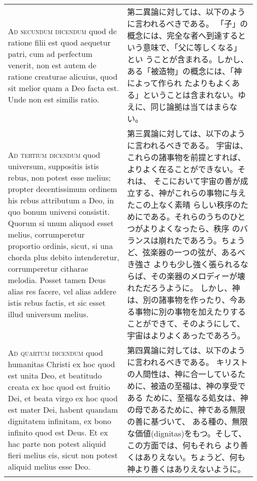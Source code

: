 \documentclass[10pt]{jsarticle} %
\begin{document}
\begin{longtable}{p{21em}p{21em}}
\\


{\scshape Ad secundum dicendum} quod de ratione filii
est quod aequetur patri, cum ad perfectum venerit, non est autem de
ratione creaturae alicuius, quod sit melior quam a Deo facta est. Unde
non est similis ratio.


&

第二異論に対しては、以下のように言われるべきである。
「子」の概念には、完全な者へ到達するという意味で、「父に等しくなる」とい
 うことが含まれる。しかし、ある「被造物」の概念には、「神によって作られ
 たよりもよくある」ということは含まれない。ゆえに、同じ論拠は当てはまらない。


\\


{\scshape Ad tertium dicendum} quod universum,
suppositis istis rebus, non potest esse melius; propter decentissimum
ordinem his rebus attributum a Deo, in quo bonum universi
consistit. Quorum si unum aliquod esset melius, corrumperetur proportio
ordinis, sicut, si una chorda plus debito intenderetur, corrumperetur
citharae melodia. Posset tamen Deus alias res facere, vel alias addere
istis rebus factis, et sic esset illud universum melius.


&

第三異論に対しては、以下のように言われるべきである。
宇宙は、これらの諸事物を前提とすれば、よりよく在ることができない。それは、
 そこにおいて宇宙の善が成立する、神がこれらの事物に与えたこの上なく素晴
 らしい秩序のためにである。それらのうちのひとつがよりよくなったら、秩序
 のバランスは崩れたであろう。ちょうど、弦楽器の一つの弦が、あるべき強さ
 よりも少し強く張られるならば、その楽器のメロディーが壊れただろうように。
 しかし、神は、別の諸事物を作ったり、今ある事物に別の事物を加えたりする
 ことができて、そのようにして、宇宙はよりよくあったであろう。



\\


{\scshape Ad quartum dicendum} quod humanitas Christi ex
hoc quod est unita Deo, et beatitudo creata ex hoc quod est fruitio Dei,
et beata virgo ex hoc quod est mater Dei, habent quandam dignitatem
infinitam, ex bono infinito quod est Deus. Et ex hac parte non potest
aliquid fieri melius eis, sicut non potest aliquid melius esse Deo.


&
第四異論に対しては、以下のように言われるべきである。
キリストの人間性は、神に合一しているために、被造の至福は、神の享受である
 ために、至福なる処女は、神の母であるために、神である無限の善に基づいて、
 ある種の、無限な価値(dignitas)をもつ。そして、この方面では、何もそれら
 より善くはありえない。ちょうど、何も神より善くはありえないように。



\end{longtable}
\newpage
\end{document}
